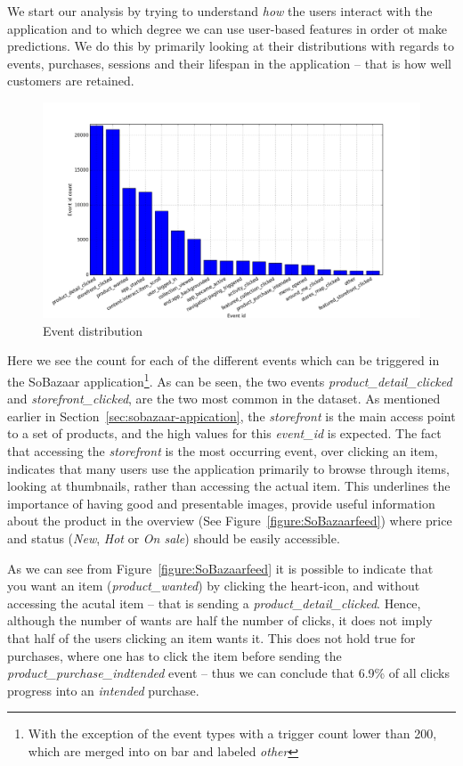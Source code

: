 We start our analysis by trying to understand \textit{how} the users interact
with the application and to which degree we can use user-based features in
order ot make predictions. We do this by primarily looking at their
distributions with regards to events, purchases, sessions and their lifespan in
the application -- that is how well customers are retained.

\begin{figure}[H]
  \includegraphics[width=5in]{image/event_iddistribution.png}
  \centering
  \caption{Event distribution}
\label{figure:eventIDDistribution}
\end{figure}

Here we see the count for each of the different events which can be triggered
in the SoBazaar application\footnote{With the exception of the event types with
a trigger count lower than 200, which are merged into on bar and labeled
\emph{other}}. As can be seen, the two events \emph{product\_detail\_clicked}
and \emph{storefront\_clicked}, are the two most common in the dataset. As
mentioned earlier in Section~\ref{sec:sobazaar-appication}, the
\emph{storefront} is the main access point to a set of products, and the high
values for this \emph{event\_id} is expected. The fact that accessing the
\emph{storefront} is the most occurring event, over clicking an item, indicates
that many users use the application primarily to browse through items, looking
at thumbnails, rather than accessing the actual item. This underlines the
importance of having good and presentable images, provide useful information
about the product in the overview (See Figure~\ref{figure:SoBazaarfeed}) where
price and status (\textit{New}, \textit{Hot} or \textit{On sale}) should be
easily accessible.

As we can see from Figure~\ref{figure:SoBazaarfeed} it is possible to indicate
that you want an item (\textit{product\_wanted}) by clicking the heart-icon,
and without accessing the acutal item -- that is sending a
\textit{product\_detail\_clicked}. Hence, although the number of wants are half
the number of clicks, it does not imply that half of the users clicking an item
wants it. This does not hold true for purchases, where one has to click the
item before sending the \textit{product\_purchase\_indtended} event -- thus we
can conclude that 6.9\% of all clicks progress into an \textit{intended}
purchase.

